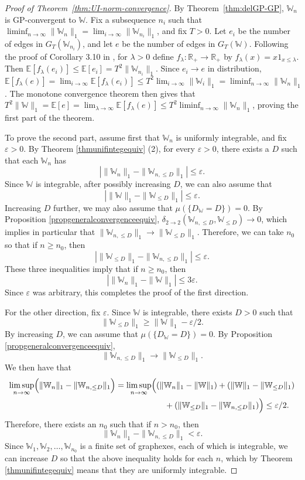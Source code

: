 \documentclass{amsart}
\numberwithin{equation}{section}
\numberwithin{figure}{section}
\theoremstyle{definition}
\theoremstyle{remark}
\newcommand{\EE}{\mathbb{E}}
\newcommand{\RR}{\mathbb{R}}
\newcommand{\cW}{\mathbb{W}}
\newcommand{\deltt}{\delta_{2\to 2}}
\begin{document}
\begin{proof}[Proof of Theorem~\ref{thm:UI-norm-convergence}]
By Theorem~\ref{thm:delGP-GP}, $\cW_n$ is GP-convergent to $\cW$. Fix a
subsequence $n_i$ such that $
\liminf_{n\to\infty}\|\cW_n\|_1=\lim_{i\to\infty} \|\cW_{n_i}\|_1$, and fix
$T>0$. Let $e_i$ be the number of edges in $G_T(\cW_{n_i})$, and let $e$ be
the number of edges in $G_T(\cW)$. Following the proof of Corollary 3.10 in
\cite{BCCV17}, for $\lambda>0$ define $f_\lambda\colon\RR_+\to\RR_+$ by
$f_\lambda(x)=x 1_{x\leq \lambda}$. Then $\EE[f_\lambda(e_i)]\leq
\EE[e_i]=T^2\|\cW_{n_i}\|_1$. Since $e_i\to e$ in distribution,
$\EE[f_\lambda(e)]=\lim_{i\to\infty}\EE[f_\lambda(e_i)]\leq
T^2\lim_{i\to\infty}\|\cW_i\|_1=\liminf_{n\to\infty}\|\cW_n\|_1$. The
monotone convergence theorem then gives that
$T^2\|\cW\|_1=\EE[e]=\lim_{\lambda\to\infty}\EE[f_\lambda(e)]\leq
T^2\liminf_{n\to\infty}\|\cW_n\|_1$, proving the first part of the theorem.

To prove the second part, assume first that $\cW_n$ is uniformly integrable,
and fix $\varepsilon>0$. By Theorem \ref{thmunifintegequiv} (2), for every
$\varepsilon>0$, there exists a $D$ such that each $\cW_n$ has
\[
\left|\|\cW_n\|_1 - \|\cW_{n,\le D}\|_1\right| \le \varepsilon.
\]
Since $\cW$ is integrable, after possibly increasing $D$, we can also assume that
\[
\left|\|\cW\|_1 - \|\cW_{\le D}\|_1\right| \le \varepsilon.
\]
Increasing $D$ further, we may also assume that $\mu(\{D_{\cW}=D\})=0$. By
Proposition \ref{propgeneralconvergenceequiv}, $\deltt(\cW_{n, \le
D},\cW_{\le D}) \rightarrow 0$, which implies in particular that $\|\cW_{n,
\le D}\|_1 \rightarrow \|\cW_{\le D}\|_1$. Therefore, we can take $n_0$ so
that if $n \ge n_0$, then
\[
\left|\|\cW_{\le D}\|_1 - \|\cW_{n,\le D}\|_1\right| \le \varepsilon.
\]
These three inequalities imply that if $n \ge n_0$, then
\[
\left|\|\cW_n\|_1 - \|\cW\|_1\right| \le 3\varepsilon.
\]
Since $\varepsilon$ was arbitrary, this completes the proof of the first
direction.

For the other direction, fix $\varepsilon$. Since $\cW$ is integrable, there
exists $D>0$ such that
\[
\|\cW_{\le D}\|_1 \ge \|\cW\|_1 - \varepsilon/2.
\]
By increasing $D$, we can assume that $\mu(\{D_{\cW}=D\})=0$. By Proposition
\ref{propgeneralconvergenceequiv},
\[\|\cW_{n,\le D}\|_1 \to \|\cW_{\le D}\|_1.
\]
We then have that
\begin{align*}
\limsup_{n \to \infty}
\Bigl(\|\cW_n\|_1-\|\cW_{n,\le D}\|_1 \Bigr)
&= \limsup_{n \to \infty}
\Bigl( (\|\cW_n\|_1 - \|\cW\|_1)
+(\|\cW\|_1-\|\cW_{\le D}\|_1)\\
& \qquad \qquad \qquad \phantom{}
+(\|\cW_{\le D}\|_1-\|\cW_{n,\le D}\|_1) \Bigr)\le \varepsilon/2
.
\end{align*}
Therefore, there exists an $n_0$ such that if $n > n_0$, then
\[
\|\cW_n\|_1 - \|\cW_{n,\le D}\|_1 <\varepsilon.
\]
Since $\cW_1,\cW_2,\dots,\cW_{n_0}$ is a finite set of graphexes, each of
which is integrable, we can increase $D$ so that the above inequality holds
for each $n$, which by Theorem \ref{thmunifintegequiv} means that they are
uniformly integrable.
\end{proof}
\end{document}
